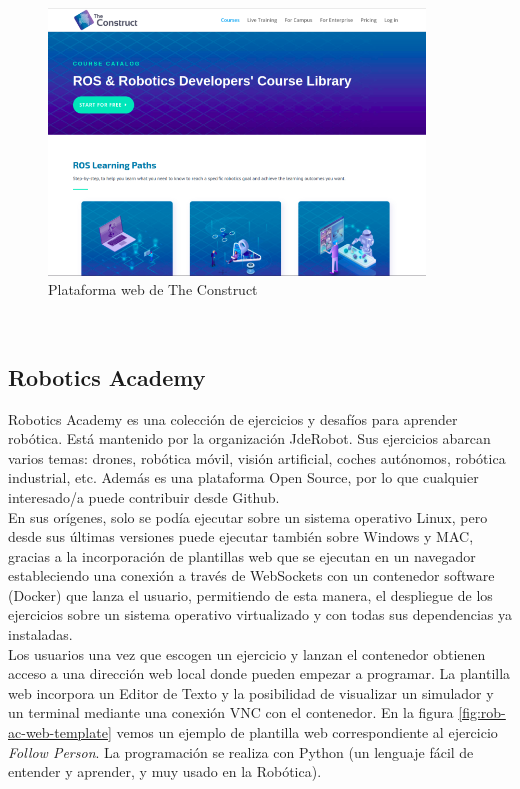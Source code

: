 \begin{figure}[H]
  \begin{center}
    \includegraphics[width=10cm]{imagenes/cap1/the-construct.png}
  \end{center}
  \caption[Plataforma web de The Construct]{Plataforma web de The Construct\cite{the-construct}}
  \label{fig:r-cnn}
\end{figure}\

\subsection{Robotics Academy}
\label{sec:robotics_academy}
Robotics Academy \cite{robotics-academy} es una colección de ejercicios y desafíos para aprender robótica. Está mantenido por la organización JdeRobot. Sus ejercicios abarcan varios temas: drones, robótica móvil, visión artificial, coches autónomos, robótica industrial, etc. Además es una plataforma Open Source, por lo que cualquier interesado/a puede contribuir desde Github.\\

En sus orígenes, solo se podía ejecutar sobre un sistema operativo Linux, pero desde sus últimas versiones puede ejecutar también sobre Windows y MAC, gracias a la incorporación de plantillas web que se ejecutan en un navegador estableciendo una conexión a través de WebSockets con un contenedor software (Docker) que lanza el usuario, permitiendo de esta manera, el despliegue de los ejercicios sobre un sistema operativo virtualizado y con todas sus dependencias ya instaladas.\\

Los usuarios una vez que escogen un ejercicio y lanzan el contenedor obtienen acceso a una dirección web local donde pueden empezar a programar. La plantilla web incorpora un Editor de Texto y la posibilidad de visualizar un simulador y un terminal mediante una conexión VNC con el contenedor. En la figura \ref{fig:rob-ac-web-template} vemos un ejemplo de plantilla web correspondiente al ejercicio \textit{Follow Person}. La programación se realiza con Python (un lenguaje fácil de entender y aprender, y muy usado en la Robótica).\\

